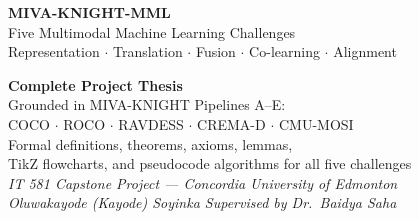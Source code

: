 \documentclass[12pt,a4paper]{article}
\theoremstyle{definition}
\theoremstyle{plain}
\theoremstyle{remark}
\begin{document}
\begin{titlepage}

\vspace*{3cm}
{\color{white}\fontsize{28}{34}\selectfont\bfseries\hspace{1.2cm}MIVA-KNIGHT-MML}\\[0.4cm]
{\color{white!85}\fontsize{17}{21}\selectfont\hspace{1.2cm}Five Multimodal Machine Learning Challenges}\\[0.15cm]
{\color{white!75}\fontsize{13}{17}\selectfont\hspace{1.2cm}Representation $\cdot$ Translation $\cdot$ Fusion $\cdot$ Co-learning $\cdot$ Alignment}

\vspace{1.5cm}
\begin{center}
\begin{tcolorbox}[width=0.90\textwidth,colback=white,colframe=NavyBlue,arc=6pt,boxrule=1.5pt]
\centering
\textbf{Complete Project Thesis}\\[6pt]
Grounded in MIVA-KNIGHT Pipelines A--E:\\
COCO $\cdot$ ROCO $\cdot$ RAVDESS $\cdot$ CREMA-D $\cdot$ CMU-MOSI\\[6pt]
Formal definitions, theorems, axioms, lemmas,\\
TikZ flowcharts, and pseudocode algorithms for all five challenges\\[8pt]
\small\textit{IT 581 Capstone Project — Concordia University of Edmonton}\\
\textit{Oluwakayode (Kayode) Soyinka \quad Supervised by Dr.\ Baidya Saha}
\end{tcolorbox}
\end{center}


\end{titlepage}
\end{document}
